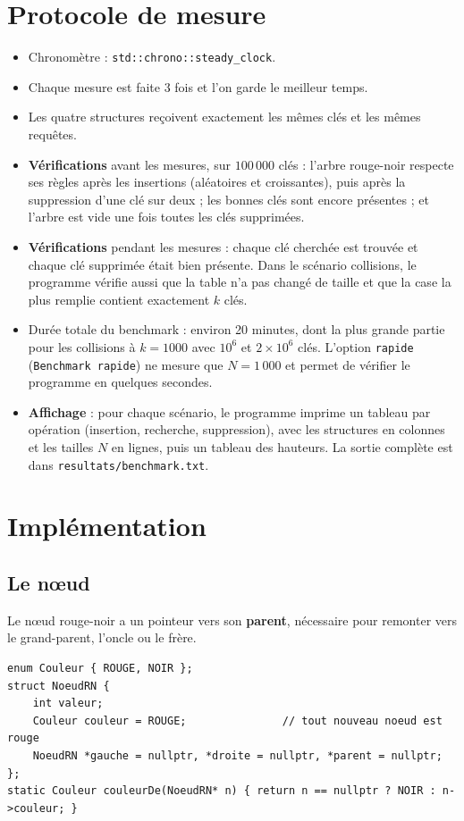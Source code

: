 \documentclass[12pt,a4paper]{report}
\begin{document}
\section{Protocole de mesure}
\begin{itemize}
  \item Chronomètre : \texttt{std::chrono::steady\_clock}.
  \item Chaque mesure est faite 3 fois et l'on garde le meilleur temps.
  \item Les quatre structures reçoivent exactement les mêmes clés et les mêmes requêtes.
  \item \textbf{Vérifications} avant les mesures, sur $100\,000$ clés : l'arbre rouge-noir respecte ses règles après les insertions (aléatoires et croissantes), puis après la suppression d'une clé sur deux ; les bonnes clés sont encore présentes ; et l'arbre est vide une fois toutes les clés supprimées.
  \item \textbf{Vérifications} pendant les mesures : chaque clé cherchée est trouvée et chaque clé supprimée était bien présente. Dans le scénario collisions, le programme vérifie aussi que la table n'a pas changé de taille et que la case la plus remplie contient exactement $k$ clés.
  \item Durée totale du benchmark : environ 20 minutes, dont la plus grande partie pour les collisions à $k = 1000$ avec $10^6$ et $2\times10^6$ clés. L'option \texttt{rapide} (\texttt{Benchmark rapide}) ne mesure que $N = 1\,000$ et permet de vérifier le programme en quelques secondes.
  \item \textbf{Affichage} : pour chaque scénario, le programme imprime un tableau par opération (insertion, recherche, suppression), avec les structures en colonnes et les tailles $N$ en lignes, puis un tableau des hauteurs. La sortie complète est dans \texttt{resultats/benchmark.txt}.
\end{itemize}

\section{Implémentation}

\subsection{Le nœud}
Le nœud rouge-noir a un pointeur vers son \textbf{parent}, nécessaire pour remonter vers le grand-parent, l'oncle ou le frère.
\begin{lstlisting}
enum Couleur { ROUGE, NOIR };
struct NoeudRN {
    int valeur;
    Couleur couleur = ROUGE;               // tout nouveau noeud est rouge
    NoeudRN *gauche = nullptr, *droite = nullptr, *parent = nullptr;
};
static Couleur couleurDe(NoeudRN* n) { return n == nullptr ? NOIR : n->couleur; }
\end{lstlisting}
\end{document}
